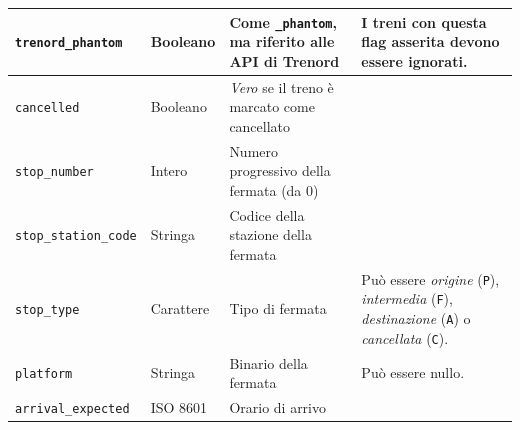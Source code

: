 \documentclass[12pt,a4paper,italian]{report}
\begin{document}
\begin{table}[p]
\begin{tabular}{m{3.5cm} || m{1.7cm} | m{5.3cm} | m{3.5cm}}
      \hline \texttt{trenord\_phantom} & Booleano & Come
                                                    \texttt{\_phantom},
                                                    ma riferito alle API
                                                    di Trenord
                                                            & I treni
                                                              con
                                                              questa
                                                              flag
                                                              asserita
                                                              devono
                                                              essere
                                                              ignorati. \\
      \hline \texttt{cancelled} & Booleano & \textit{Vero} se il treno 
                                             è marcato come cancellato \\
      \hline \texttt{stop\_number} & Intero & Numero progressivo della
                                              fermata (da 0) & \\
      \hline \texttt{stop\_station\_code} & Stringa & Codice della
                                                      stazione della
                                                      fermata & \\
      \hline \texttt{stop\_type} & Carattere & Tipo di fermata
                                                            & Può essere
                                                              \textit{origine}
                                                              (\texttt{P}),
                                                              \textit{intermedia}
                                                              (\texttt{F}),
                                                              \textit{destinazione}
                                                              (\texttt{A}) o
                                                              \textit{cancellata}
                                                              (\texttt{C}).
      \\
      \hline \texttt{platform} & Stringa & Binario della fermata & Può
                                                                   essere
                                                                   nullo. \\
      \hline \texttt{arrival\_expected} & ISO 8601 & Orario di arrivo

\end{tabular}
\end{table}
\end{document}
